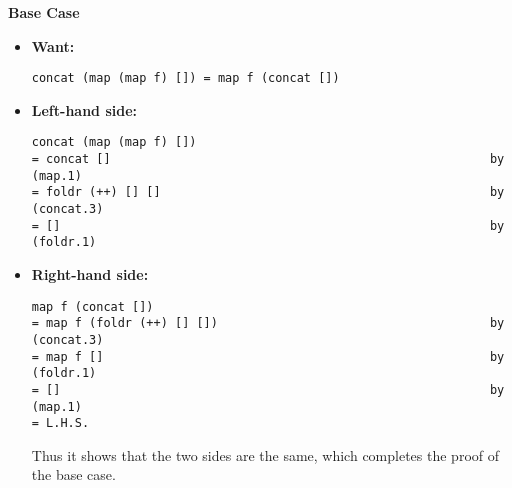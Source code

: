 \documentclass[11pt]{article}
\theoremstyle{definition}
\begin{document}
\begin{enumerate}
\textbf{Base Case}
\begin{itemize}
\item \textbf{Want:}
\begin{verbatim}
concat (map (map f) []) = map f (concat [])
\end{verbatim}
\item \textbf{Left-hand side:}
\begin{verbatim}
concat (map (map f) [])
= concat []                                                     by (map.1)
= foldr (++) [] []                                              by (concat.3)
= []                                                            by (foldr.1)
\end{verbatim}
\item \textbf{Right-hand side:}
\begin{verbatim}
map f (concat [])
= map f (foldr (++) [] [])                                      by (concat.3)
= map f []                                                      by (foldr.1)
= []                                                            by (map.1)
= L.H.S.
\end{verbatim}
Thus it shows that the two sides are the same, which completes the proof of the base case.
\end{itemize}


\end{enumerate}
\end{document}
